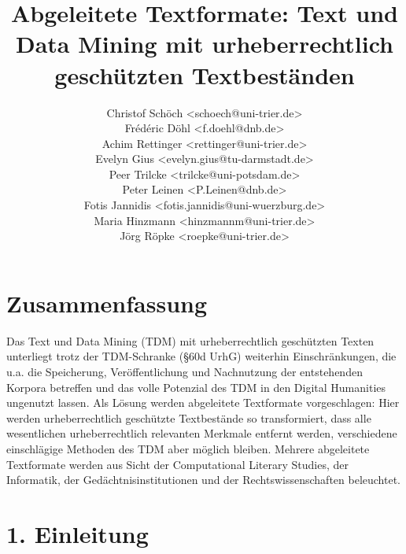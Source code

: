 \title{Abgeleitete Textformate: Text und Data Mining mit urheberrechtlich geschützten Textbeständen}

\author{
Christof Schöch <schoech@uni-trier.de>\\
Frédéric Döhl <f.doehl@dnb.de>\\
Achim Rettinger <rettinger@uni-trier.de>\\
Evelyn Gius <evelyn.gius@tu-darmstadt.de>\\
Peer Trilcke <trilcke@uni-potsdam.de>\\
Peter Leinen <P.Leinen@dnb.de>\\
Fotis Jannidis <fotis.jannidis@uni-wuerzburg.de>\\
Maria Hinzmann <hinzmannm@uni-trier.de>\\
Jörg Röpke <roepke@uni-trier.de>\\
}


\maketitle
\section{Zusammenfassung}
Das Text und Data Mining (TDM) mit urheberrechtlich geschützten Texten unterliegt trotz der TDM-Schranke (§60d UrhG) weiterhin Einschränkungen, die u.a. die Speicherung, Veröffentlichung und Nachnutzung der entstehenden Korpora betreffen und das volle Potenzial des TDM in den Digital Humanities ungenutzt lassen. Als Lösung werden abgeleitete Textformate vorgeschlagen: Hier werden urheberrechtlich geschützte Textbestände so transformiert, dass alle wesentlichen urheberrechtlich relevanten Merkmale entfernt werden, verschiedene einschlägige Methoden des TDM aber möglich bleiben. Mehrere abgeleitete Textformate werden aus Sicht der Computational Literary Studies, der Informatik, der Gedächtnisinstitutionen und der Rechtswissenschaften beleuchtet.

\section{1. Einleitung}

